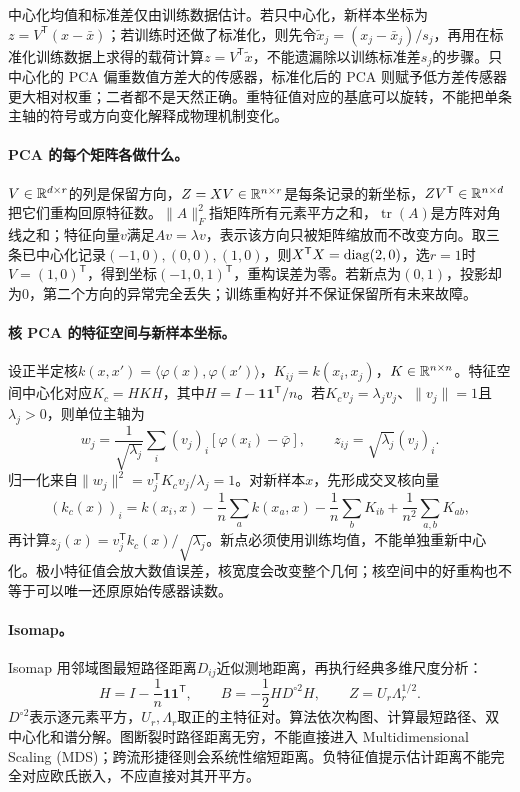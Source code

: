 中心化均值和标准差仅由训练数据估计。若只中心化，新样本坐标为$z=V^{\mathsf T}(x-\bar x)$；若训练时还做了标准化，则先令$\widetilde x_j=(x_j-\bar x_j)/s_j$，再用在标准化训练数据上求得的载荷计算$z=V^{\mathsf T}\widetilde x$，不能遗漏除以训练标准差$s_j$的步骤。只中心化的 PCA 偏重数值方差大的传感器，标准化后的 PCA 则赋予低方差传感器更大相对权重；二者都不是天然正确。重特征值对应的基底可以旋转，不能把单条主轴的符号或方向变化解释成物理机制变化。

\paragraph{PCA 的每个矩阵各做什么。}
$V\in\mathbb{R}^{d\times r}$的列是保留方向，$Z=XV\in\mathbb{R}^{n\times r}$是每条记录的新坐标，$ZV^{\mathsf T}\in\mathbb{R}^{n\times d}$把它们重构回原特征数。$\|A\|_F^2$指矩阵所有元素平方之和，$\operatorname{tr}(A)$是方阵对角线之和；特征向量$v$满足$Av=\lambda v$，表示该方向只被矩阵缩放而不改变方向。取三条已中心化记录$(-1,0),(0,0),(1,0)$，则$X^{\mathsf T}X=\operatorname{diag}(2,0)$，选$r=1$时$V=(1,0)^{\mathsf T}$，得到坐标$(-1,0,1)^{\mathsf T}$，重构误差为零。若新点为$(0,1)$，投影却为$0$，第二个方向的异常完全丢失；训练重构好并不保证保留所有未来故障。

\paragraph{核 PCA 的特征空间与新样本坐标。}
设正半定核$k(x,x')=\langle\varphi(x),\varphi(x')\rangle$，$K_{ij}=k(x_i,x_j)$，$K\in\mathbb{R}^{n\times n}$。特征空间中心化对应$K_c=HKH$，其中$H=I-\mathbf1\mathbf1^{\mathsf T}/n$。若$K_cv_j=\lambda_jv_j$、$\|v_j\|=1$且$\lambda_j>0$，则单位主轴为
\begin{equation}
 w_j=\frac1{\sqrt{\lambda_j}}\sum_i(v_j)_i
 [\varphi(x_i)-\bar\varphi],\qquad
 z_{ij}=\sqrt{\lambda_j}(v_j)_i.
\end{equation}
归一化来自$\|w_j\|^2=v_j^{\mathsf T}K_cv_j/\lambda_j=1$。对新样本$x$，先形成交叉核向量
\begin{equation}
 (k_c(x))_i=k(x_i,x)-\frac1n\sum_a k(x_a,x)
 -\frac1n\sum_bK_{ib}+\frac1{n^2}\sum_{a,b}K_{ab},
\end{equation}
再计算$z_j(x)=v_j^{\mathsf T}k_c(x)/\sqrt{\lambda_j}$。新点必须使用训练均值，不能单独重新中心化。极小特征值会放大数值误差，核宽度会改变整个几何；核空间中的好重构也不等于可以唯一还原原始传感器读数。

\paragraph{Isomap。}
Isomap 用邻域图最短路径距离$D_{ij}$近似测地距离，再执行经典多维尺度分析\cite{tenenbaum2000isomap}：
\begin{equation}
 H=I-\frac1n\mathbf1\mathbf1^{\mathsf T},\qquad
 B=-\frac12H D^{\circ2}H,\qquad Z=U_r\Lambda_r^{1/2}.
\end{equation}
$D^{\circ2}$表示逐元素平方，$U_r,\Lambda_r$取正的主特征对。算法依次构图、计算最短路径、双中心化和谱分解。图断裂时路径距离无穷，不能直接进入 Multidimensional Scaling (MDS)；跨流形捷径则会系统性缩短距离。负特征值提示估计距离不能完全对应欧氏嵌入，不应直接对其开平方。

